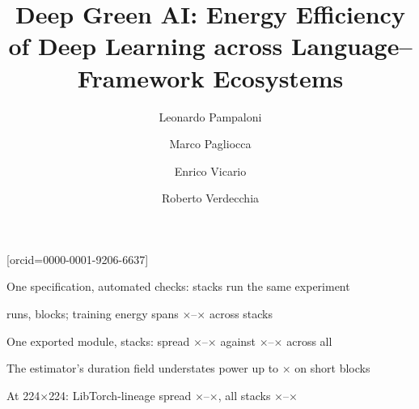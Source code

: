 \documentclass[a4paper,fleqn]{cas-dc}
\begin{document}
\let\WriteBookmarks\relax
\def\floatpagepagefraction{1}
\def\textpagefraction{.001}

\title[mode=title]{Deep Green AI: Energy Efficiency of Deep Learning across Language--Framework Ecosystems}






\author[1]{Leonardo Pampaloni}\cormark[1]

\author[1]{Marco Pagliocca}\cormark[1]



\author[1]{Enrico Vicario}

\author[1]{Roberto Verdecchia}[orcid=0000-0001-9206-6637]


\address[1]{University of Florence, Florence, Italy}




\begin{highlights}
\setlength{\itemsep}{2pt}\setlength{\parskip}{0pt}\setlength{\topsep}{0pt}
\item One specification, \vConformanceChecks{} automated checks: \vEcosystems{} stacks run the same experiment
\item \vRuns{} runs, \vBlocks{} blocks; training energy spans \vSpreadTrainMin$\times$--\vSpreadTrainMax$\times$ across stacks
\item One exported module, \vCtrlStacks{} stacks: spread \vCtrlSpreadMin$\times$--\vCtrlSpreadMax$\times$ against \vSpreadTrainMin$\times$--\vSpreadTrainMax$\times$ across all \vEcosystems{}
\item The estimator's duration field understates power up to \vPowerUnderstatedWorst$\times$ on short blocks
\item At 224$\times$224: LibTorch-lineage spread \vSatLibtorchSpreadTrainVgg$\times$--\vSatLibtorchSpreadTrainResnet$\times$, all \vEcosystems{} stacks \vSatSpreadTrainResnet$\times$--\vSatSpreadTrainVgg$\times$
\end{highlights}
\end{document}
